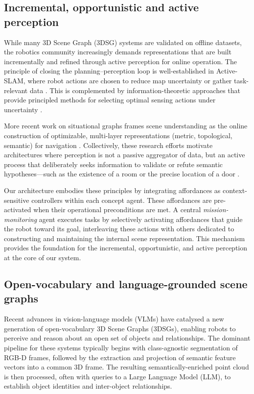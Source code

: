 \documentclass[10pt,a4paper]{article}
\begin{document}
\subsection{Incremental, opportunistic and active perception} 
While many 3D Scene Graph (3DSG) systems are validated on offline datasets, the robotics community increasingly demands representations that are built incrementally and refined through active perception for online operation. The principle of closing the planning–perception loop is well-established in Active-SLAM, where robot actions are chosen to reduce map uncertainty or gather task-relevant data \cite{burgard1997active, slam_2023}. This is complemented by information-theoretic approaches that provide principled methods for selecting optimal sensing actions under uncertainty \cite{1041446, lluvia2021active}.

More recent work on situational graphs frames scene understanding as the online construction of optimizable, multi-layer representations (metric, topological, semantic) for navigation \cite{bavle2022situational, shaheer2023graph, bavle023fromslamtosituationalawareness, millan2023better}. Collectively, these research efforts motivate architectures where perception is not a passive aggregator of data, but an active process that deliberately seeks information to validate or refute semantic hypotheses—such as the existence of a room or the precise location of a door \cite{slam_2023, BajcsyAT16}.

Our architecture embodies these principles by integrating affordances as context-sensitive controllers within each concept agent. These affordances are pre-activated when their operational preconditions are met. A central \textit{mission-monitoring} agent executes tasks by selectively activating affordances that guide the robot toward its goal, interleaving these actions with others dedicated to constructing and maintaining the internal scene representation. This mechanism provides the foundation for the incremental, opportunistic, and active perception at the core of our system.

\subsection{Open-vocabulary and language-grounded scene graphs}


Recent advances in vision-language models (VLMs) have catalysed a new generation of open-vocabulary 3D Scene Graphs (3DSGs), enabling robots to perceive and reason about an open set of objects and relationships. The dominant pipeline for these systems typically begins with class-agnostic segmentation of RGB-D frames, followed by the extraction and projection of semantic feature vectors into a common 3D frame. The resulting semantically-enriched point cloud is then processed, often with queries to a Large Language Model (LLM), to establish object identities and inter-object relationships.
\end{document}
